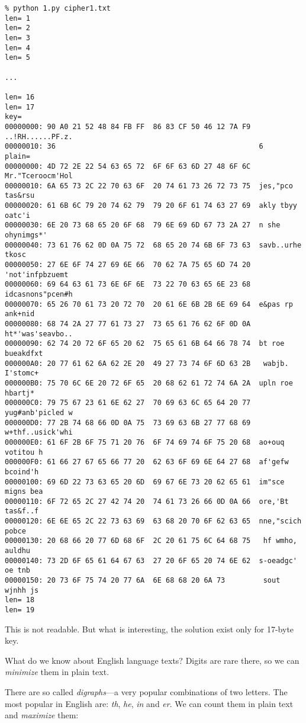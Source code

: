 \begin{lstlisting}
% python 1.py cipher1.txt
len= 1
len= 2
len= 3
len= 4
len= 5

...

len= 16
len= 17
key=
00000000: 90 A0 21 52 48 84 FB FF  86 83 CF 50 46 12 7A F9  ..!RH......PF.z.
00000010: 36                                                6
plain=
00000000: 4D 72 2E 22 54 63 65 72  6F 6F 63 6D 27 48 6F 6C  Mr."Tceroocm'Hol
00000010: 6A 65 73 2C 22 70 63 6F  20 74 61 73 26 72 73 75  jes,"pco tas&rsu
00000020: 61 6B 6C 79 20 74 62 79  79 20 6F 61 74 63 27 69  akly tbyy oatc'i
00000030: 6E 20 73 68 65 20 6F 68  79 6E 69 6D 67 73 2A 27  n she ohynimgs*'
00000040: 73 61 76 62 0D 0A 75 72  68 65 20 74 6B 6F 73 63  savb..urhe tkosc
00000050: 27 6E 6F 74 27 69 6E 66  70 62 7A 75 65 6D 74 20  'not'infpbzuemt
00000060: 69 64 63 61 73 6E 6F 6E  73 22 70 63 65 6E 23 68  idcasnons"pcen#h
00000070: 65 26 70 61 73 20 72 70  20 61 6E 6B 2B 6E 69 64  e&pas rp ank+nid
00000080: 68 74 2A 27 77 61 73 27  73 65 61 76 62 6F 0D 0A  ht*'was'seavbo..
00000090: 62 74 20 72 6F 65 20 62  75 65 61 6B 64 66 78 74  bt roe bueakdfxt
000000A0: 20 77 61 62 6A 62 2E 20  49 27 73 74 6F 6D 63 2B   wabjb. I'stomc+
000000B0: 75 70 6C 6E 20 72 6F 65  20 68 62 61 72 74 6A 2A  upln roe hbartj*
000000C0: 79 75 67 23 61 6E 62 27  70 69 63 6C 65 64 20 77  yug#anb'picled w
000000D0: 77 2B 74 68 66 0D 0A 75  73 69 63 6B 27 77 68 69  w+thf..usick'whi
000000E0: 61 6F 2B 6F 75 71 20 76  6F 74 69 74 6F 75 20 68  ao+ouq votitou h
000000F0: 61 66 27 67 65 66 77 20  62 63 6F 69 6E 64 27 68  af'gefw bcoind'h
00000100: 69 6D 22 73 63 65 20 6D  69 67 6E 73 20 62 65 61  im"sce migns bea
00000110: 6F 72 65 2C 27 42 74 20  74 61 73 26 66 0D 0A 66  ore,'Bt tas&f..f
00000120: 6E 6E 65 2C 22 73 63 69  63 68 20 70 6F 62 63 65  nne,"scich pobce
00000130: 20 68 66 20 77 6D 68 6F  2C 20 61 75 6C 64 68 75   hf wmho, auldhu
00000140: 73 2D 6F 65 61 64 67 63  27 20 6F 65 20 74 6E 62  s-oeadgc' oe tnb
00000150: 20 73 6F 75 74 20 77 6A  6E 68 68 20 6A 73         sout wjnhh js
len= 18
len= 19
\end{lstlisting}

This is not readable. But what is interesting, the solution exist only for 17-byte key.

What do we know about English language texts?
Digits are rare there, so we can \emph{minimize} them in plain text.

There are so called \emph{digraphs}---a very popular combinations of two letters.
The most popular in English are: \emph{th}, \emph{he}, \emph{in} and \emph{er}.
We can count them in plain text and \emph{maximize} them:

